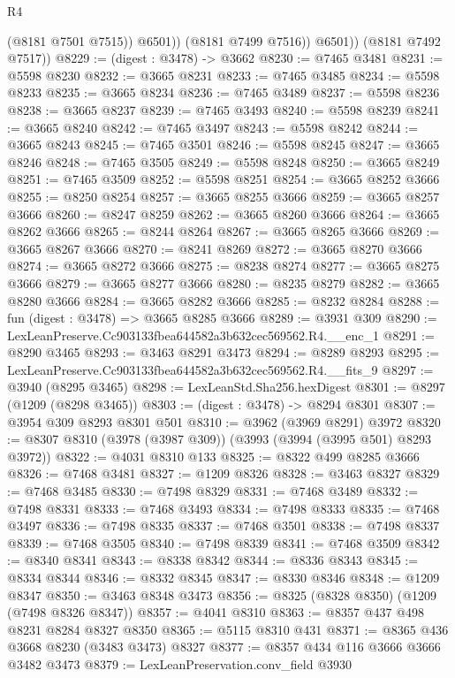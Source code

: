 \begin{lexlean}{R4}
\begin{coremodule}
                  (@8181 @7501 @7515))
                @6501))
            (@8181 @7499 @7516))
          @6501))
      (@8181 @7492 @7517))
@8229 := (digest : @3478) -> @3662
@8230 := @7465 @3481
@8231 := @5598 @8230
@8232 := @3665 @8231
@8233 := @7465 @3485
@8234 := @5598 @8233
@8235 := @3665 @8234
@8236 := @7465 @3489
@8237 := @5598 @8236
@8238 := @3665 @8237
@8239 := @7465 @3493
@8240 := @5598 @8239
@8241 := @3665 @8240
@8242 := @7465 @3497
@8243 := @5598 @8242
@8244 := @3665 @8243
@8245 := @7465 @3501
@8246 := @5598 @8245
@8247 := @3665 @8246
@8248 := @7465 @3505
@8249 := @5598 @8248
@8250 := @3665 @8249
@8251 := @7465 @3509
@8252 := @5598 @8251
@8254 := @3665 @8252 @3666
@8255 := @8250 @8254
@8257 := @3665 @8255 @3666
@8259 := @3665 @8257 @3666
@8260 := @8247 @8259
@8262 := @3665 @8260 @3666
@8264 := @3665 @8262 @3666
@8265 := @8244 @8264
@8267 := @3665 @8265 @3666
@8269 := @3665 @8267 @3666
@8270 := @8241 @8269
@8272 := @3665 @8270 @3666
@8274 := @3665 @8272 @3666
@8275 := @8238 @8274
@8277 := @3665 @8275 @3666
@8279 := @3665 @8277 @3666
@8280 := @8235 @8279
@8282 := @3665 @8280 @3666
@8284 := @3665 @8282 @3666
@8285 := @8232 @8284
@8288 := fun (digest : @3478) => @3665 @8285 @3666
@8289 := @3931 @309
@8290 := LexLeanPreserve.Cc903133fbea644582a3b632cec569562.R4.__enc_1
@8291 := @8290 @3465
@8293 := @3463 @8291 @3473
@8294 := @8289 @8293
@8295 := LexLeanPreserve.Cc903133fbea644582a3b632cec569562.R4.__fits_9
@8297 := @3940 (@8295 @3465)
@8298 := LexLeanStd.Sha256.hexDigest
@8301 := @8297 (@1209 (@8298 @3465))
@8303 := (digest : @3478) -> @8294 @8301
@8307 := @3954 @309 @8293 @8301 @501
@8310 := @3962 (@3969 @8291) @3972
@8320 := @8307 @8310 (@3978 (@3987 @309)) (@3993 (@3994 (@3995 @501) @8293 @3972))
@8322 := @4031 @8310 @133
@8325 := @8322 @499 @8285 @3666
@8326 := @7468 @3481
@8327 := @1209 @8326
@8328 := @3463 @8327
@8329 := @7468 @3485
@8330 := @7498 @8329
@8331 := @7468 @3489
@8332 := @7498 @8331
@8333 := @7468 @3493
@8334 := @7498 @8333
@8335 := @7468 @3497
@8336 := @7498 @8335
@8337 := @7468 @3501
@8338 := @7498 @8337
@8339 := @7468 @3505
@8340 := @7498 @8339
@8341 := @7468 @3509
@8342 := @8340 @8341
@8343 := @8338 @8342
@8344 := @8336 @8343
@8345 := @8334 @8344
@8346 := @8332 @8345
@8347 := @8330 @8346
@8348 := @1209 @8347
@8350 := @3463 @8348 @3473
@8356 := @8325 (@8328 @8350) (@1209 (@7498 @8326 @8347))
@8357 := @4041 @8310
@8363 := @8357 @437 @498 @8231 @8284 @8327 @8350
@8365 := @5115 @8310 @431
@8371 := @8365 @436 @3668 @8230 (@3483 @3473) @8327
@8377 := @8357 @434 @116 @3666 @3666 @3482 @3473
@8379 := LexLeanPreservation.conv_field @3930

\end{coremodule}
\end{lexlean}
